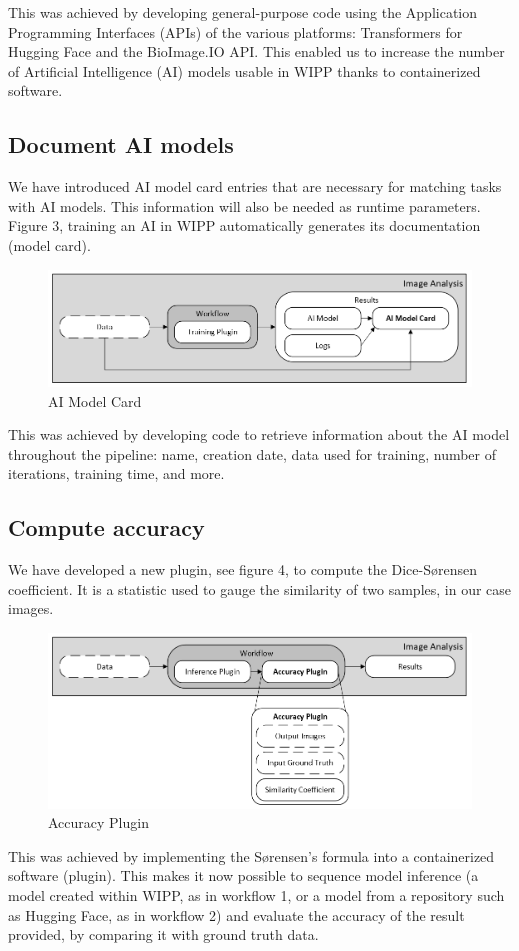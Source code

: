 This was achieved by developing general-purpose code using the Application
Programming Interfaces (APIs) of the various platforms: Transformers for Hugging
Face and the BioImage.IO API. This enabled us to increase the number of
Artificial Intelligence (AI) models usable in WIPP thanks to containerized
software.

\subsection{Document AI models}

We have introduced AI model card entries that are necessary for matching tasks
with AI models. This information will also be needed as runtime parameters.
Figure 3, training an AI in WIPP automatically generates its documentation
(model card).

\begin{figure}[H]
  \centering
  \includegraphics[width=0.8\linewidth]{png/3_ai_model_card.png}
  \caption{AI Model Card}
  \label{fig:3aimodelcard}
\end{figure}

This was achieved by developing code to retrieve information about the AI model
throughout the pipeline: name, creation date, data used for training, number of
iterations, training time, and more.

\subsection{Compute accuracy}

We have developed a new plugin, see figure 4, to compute the Dice-Sørensen
coefficient. It is a statistic used to gauge the similarity of two samples, in
our case images.

\begin{figure}[H]
  \centering
  \includegraphics[width=0.8\linewidth]{png/4_accuracy.png}
  \caption{Accuracy Plugin}
  \label{fig:4accuracy}
\end{figure}

This was achieved by implementing the Sørensen's formula into a containerized
software (plugin). This makes it now possible to sequence model inference (a
model created within WIPP, as in workflow 1, or a model from a repository such
as Hugging Face, as in workflow 2) and evaluate the accuracy of the result
provided, by comparing it with ground truth data.
